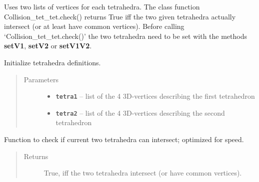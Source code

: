 \documentclass[letterpaper,10pt,english]{sphinxmanual}
\begin{document}
Uses two lists of vertices for each tetrahedra. The class function Collision\_tet\_tet.check() returns True iff the two given tetrahedra actually intersect (or at least have common vertices).
Before calling `Collision\_tet\_tet.check()' the two tetrahedra need to be set with the methods \textbf{setV1}, \textbf{setV2} or \textbf{setV1V2}.

\begin{fulllineitems}
\label{pk_src.collision_tet_tet:pk_src.collision_tet_tet.Collision_tet_tet}
Initialize tetrahedra definitions.
\begin{quote}\begin{description}
\item[{Parameters}] \leavevmode\begin{itemize}
\item {} 
\textbf{\texttt{tetra1}} -- list of the 4 3D-vertices describing the first tetrahedron

\item {} 
\textbf{\texttt{tetra2}} -- list of the 4 3D-vertices describing the second tetrahedron

\end{itemize}

\end{description}\end{quote}

\begin{fulllineitems}
\label{pk_src.collision_tet_tet:pk_src.collision_tet_tet.Collision_tet_tet.check}
Function to check if current two tetrahedra can intersect; optimized for speed.
\begin{quote}\begin{description}
\item[{Returns}] \leavevmode
True, iff the two tetrahedra intersect (or have common vertices).

\end{description}\end{quote}

\end{fulllineitems}



\end{fulllineitems}
\end{document}
